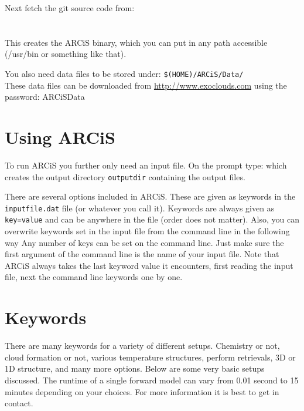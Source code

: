\documentclass[12pt]{article}
\begin{document}
Next fetch the git source code from:
%
\vspace{-2cm}\\
\vspace{-2cm}\\
\vspace{-2cm}\\
%
This creates the ARCiS binary, which you can put in any path accessible (/usr/bin or something like that).

You also need data files to be stored under: \texttt{\$(HOME)/ARCiS/Data/}\\
These data files can be downloaded from \url{http://www.exoclouds.com} using the password: ARCiSData

\section{Using ARCiS}

To run ARCiS you further only need an input file. On the prompt type:
%
%
which creates the output directory \texttt{outputdir} containing the output files.

There are several options included in ARCiS. These are given as keywords in the \texttt{inputfile.dat} file (or whatever you call it). Keywords are always given as \texttt{key=value} and can be anywhere in the file (order does not matter). Also, you can overwrite keywords set in the input file from the command line in the following way
%
%
Any number of keys can be set on the command line. Just make sure the first argument of the command line is the name of your input file. Note that ARCiS always takes the last keyword value it encounters, first reading the input file, next the command line keywords one by one.

\section{Keywords}

There are many keywords for a variety of different setups. Chemistry or not, cloud formation or not, various temperature structures, perform retrievals, 3D or 1D structure, and many more options. Below are some very basic setups discussed. The runtime of a single forward model can vary from 0.01 second to 15 minutes depending on your choices. For more information it is best to get in contact.
\end{document}
